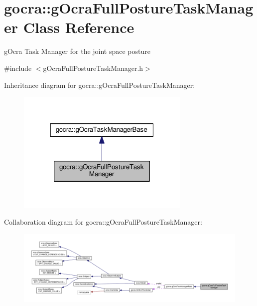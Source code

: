 \hypertarget{classgocra_1_1gOcraFullPostureTaskManager}{}\section{gocra\+:\+:g\+Ocra\+Full\+Posture\+Task\+Manager Class Reference}
\label{classgocra_1_1gOcraFullPostureTaskManager}


g\+Ocra Task Manager for the joint space posture  




{\ttfamily \#include $<$g\+Ocra\+Full\+Posture\+Task\+Manager.\+h$>$}



Inheritance diagram for gocra\+:\+:g\+Ocra\+Full\+Posture\+Task\+Manager\+:
\nopagebreak
\begin{figure}[H]
\begin{center}
\leavevmode
\includegraphics[width=235pt]{dc/d1b/classgocra_1_1gOcraFullPostureTaskManager__inherit__graph}
\end{center}
\end{figure}


Collaboration diagram for gocra\+:\+:g\+Ocra\+Full\+Posture\+Task\+Manager\+:
\nopagebreak
\begin{figure}[H]
\begin{center}
\leavevmode
\includegraphics[width=350pt]{dc/dfa/classgocra_1_1gOcraFullPostureTaskManager__coll__graph}
\end{center}
\end{figure}
